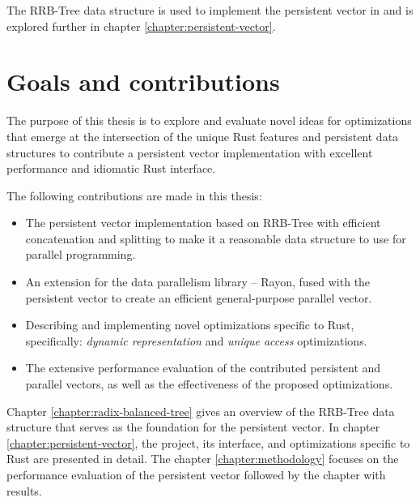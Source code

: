 The RRB-Tree data structure is used to implement the persistent vector in \pvecrs{} and is explored further in chapter \ref{chapter:persistent-vector}.

\section{Goals and contributions}
\label{sec:contributions}
The purpose of this thesis is to explore and evaluate novel ideas for optimizations that emerge at the intersection of the unique Rust features and persistent data structures to contribute a persistent vector implementation with excellent performance and idiomatic Rust interface.

The following contributions are made in this thesis:
\begin{itemize}
    \item The persistent vector implementation based on RRB-Tree with efficient concatenation and splitting to make it a reasonable data structure to use for parallel programming.
    \item An extension for the data parallelism library -- Rayon, fused with the persistent vector to create an efficient general-purpose parallel vector.
    \item Describing and implementing novel optimizations specific to Rust, specifically: \emph{dynamic representation} and \emph{unique access} optimizations.
    \item The extensive performance evaluation of the contributed persistent and parallel vectors, as well as the effectiveness of the proposed optimizations.
\end{itemize}

Chapter \ref{chapter:radix-balanced-tree} gives an overview of the RRB-Tree data structure that serves as the foundation for the persistent vector. In chapter \ref{chapter:persistent-vector}, the \pvecrs{} project, its interface, and optimizations specific to Rust are presented in detail. The chapter \ref{chapter:methodology} focuses on the performance evaluation of the persistent vector followed by the chapter with results.
